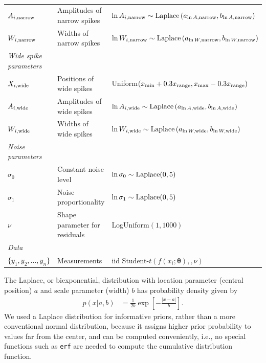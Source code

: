 \documentclass[a4paper, 12pt]{article}
\newcommand{\params}{\boldsymbol{\theta}}
\begin{document}
\begin{landscape}
\begin{table}
\begin{tabular}{|lll|}
$A_{i, \rm narrow}$ & Amplitudes of narrow spikes &
 $\ln A_{i, \rm narrow} \sim \textnormal{Laplace}\left(a_{\ln A, \rm narrow}, b_{\ln A, \rm narrow}\right)$ \\
$W_{i, \rm narrow}$ & Widths of narrow spikes &
 $\ln W_{i, \rm narrow} \sim \textnormal{Laplace}\left(a_{\ln W, \rm narrow}, b_{\ln W, \rm narrow}\right)$ \\
\hline
{\em Wide spike parameters}&&\\
$X_{i, \rm wide}$ & Positions of wide spikes &
          Uniform$(x_{\rm min}+0.3x_{\rm range}, x_{\rm max}-0.3x_{\rm range})$ \\
$A_{i, \rm wide}$ & Amplitudes of wide spikes &
 $\ln A_{i, \rm wide} \sim \textnormal{Laplace}\left(a_{\ln A, \rm wide}, b_{\ln A, \rm wide}\right)$ \\
$W_{i, \rm wide}$ & Widths of wide spikes &
 $\ln W_{i, \rm wide} \sim \textnormal{Laplace}\left(a_{\ln W, \rm wide}, b_{\ln W, \rm wide}\right)$ \\
\hline
{\em Noise parameters}&&\\
$\sigma_0$ &    Constant noise level  &   $\ln \sigma_0 \sim \textnormal{Laplace}(0,5)$\\
$\sigma_1$ &    Noise proportionality   &  $\ln \sigma_1 \sim \textnormal{Laplace}(0,5)$ \\
$\nu$     &   Shape parameter for residuals   &   LogUniform$(1, 1000)$\\
\hline
{\em Data}&&\\
\hline
$\{y_1, y_2, ..., y_n\}$  &   Measurements    & iid Student-$t(f(x_i; \params), ,\nu)$\\
\hline
\end{tabular}
\caption{\label{tab:priors}}
\end{table}

\end{landscape}

The Laplace, or biexponential, distribution with location parameter
(central position) $a$ and scale parameter (width) $b$ has probability
density given by
\begin{align}
p(x | a, b) &= \frac{1}{2b}\exp\left[-\frac{|x - a|}{b}\right].
\end{align}
We used a Laplace distribution for informative priors, rather than
a more conventional normal distribution, because it assigns higher
prior probability to values far from the center, and can be computed conveniently, i.e., no special functions such as {\tt erf} are needed
to compute the cumulative distribution function.
\end{document}
